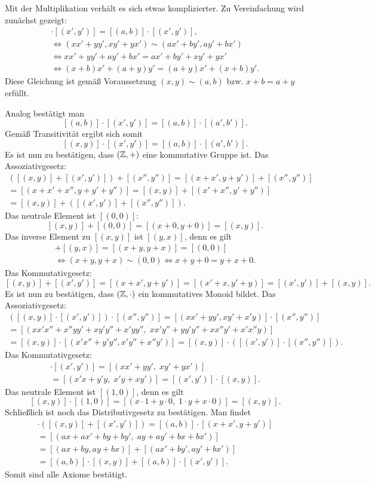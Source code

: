 Mit der Multiplikation verhält es sich etwas komplizierter.
Zu Vereinfachung wird zunächst gezeigt:
\begin{gather*}
[(x,y)]\cdot [(x',y')] = [(a,b)]\cdot [(x',y')],\\
\iff (xx'+yy',xy'+yx')\sim (ax'+by',ay'+bx')\\
\iff xx'+yy' + ay'+bx' = ax'+by' + xy'+yx'\\
\iff (x+b)x' + (a+y)y' = (a+y)x' + (x+b)y'.
\end{gather*}
Diese Gleichung ist gemäß Voraussetzung $(x,y)\sim (a,b)$
bzw. $x+b=a+y$ erfüllt.

Analog bestätigt man
\[[(a,b)]\cdot [(x',y')] = [(a,b)]\cdot [(a',b')].\]
Gemäß Transitivität ergibt sich somit
\[[(x,y)]\cdot [(x',y')] = [(a,b)]\cdot [(a',b')].\]
Es ist nun zu bestätigen, dass $(\mathbb Z,+)$ eine kommutative Gruppe ist.
Das Assoziativgesetz:
\begin{gather*}
([(x,y)]+[(x',y')])+[(x'',y'')]
= [(x+x',y+y')] + [(x'',y'')]\\
= [(x+x'+x'',y+y'+y'')]
= [(x,y)]+[(x'+x'',y'+y'')]\\
= [(x,y)]+([(x',y')]+[(x'',y'')]).
\end{gather*}
Das neutrale Element ist $[(0,0)]$:
\[[(x,y)]+[(0,0)] = [(x+0,y+0)] = [(x,y)].\]
Das inverse Element zu $[(x,y)]$ ist $[(y,x)]$, denn es gilt
\begin{gather*}
[(x,y)]+[(y,x)] = [(x+y,y+x)] = [(0,0)]\\
\iff (x+y,y+x)\sim (0,0)\iff x+y+0 = y+x+0.
\end{gather*}
Das Kommutativgesetz:
\[[(x,y)]+[(x',y')] = [(x+x',y+y')] = [(x'+x,y'+y)]
= [(x',y')]+[(x,y)].\]
Es ist nun zu bestätigen, dass $(\mathbb Z,\cdot)$ ein kommutatives
Monoid bildet. Das Assoziativgesetz:
\begin{gather*}
([(x,y)]\cdot [(x',y')])\cdot [(x'',y'')]
= [(xx'+yy',xy'+x'y)]\cdot [(x'',y'')]\\
= [(xx'x''+x''yy'+xy'y''+x'yy'',\;
xx'y''+yy'y''+xx''y'+x'x''y)]\\
= [(x,y)]\cdot [(x'x''+y'y'',x'y''+x''y')]
= [(x,y)]\cdot ([(x',y')]\cdot [(x'',y'')]).
\end{gather*}
Das Kommutativgesetz:
\begin{gather*}
[(x,y)]\cdot [(x',y')] = [(xx'+yy',\;xy'+yx')]\\
= [(x'x+y'y,\;x'y+xy')] = [(x',y')]\cdot [(x,y)].
\end{gather*}
Das neutrale Element ist $[(1,0)]$, denn es gilt
\[[(x,y)]\cdot [(1,0)] = [(x\cdot 1+y\cdot 0,\;1\cdot y+x\cdot 0)]
= [(x,y)].\]
Schließlich ist noch das Distributivgesetz zu bestätigen.
Man findet
\begin{gather*}
[(a,b)]\cdot ([(x,y)]+[(x',y')])
= [(a,b)]\cdot [(x+x',y+y')]\\
= [(ax+ax'+by+by',\;ay+ay'+bx+bx')]\\
= [(ax+by,ay+bx)]+[(ax'+by',ay'+bx')]\\
= [(a,b)]\cdot [(x,y)] + [(a,b)]\cdot [(x',y')].
\end{gather*}
Somit sind alle Axiome bestätigt.\;\qedsymbol

